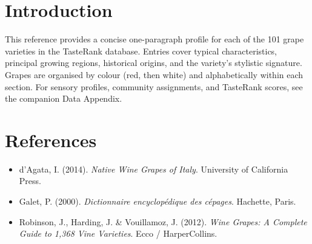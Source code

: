 \documentclass[11pt]{article}
\begin{document}

\section*{Introduction}
This reference provides a concise one-paragraph profile for each of the 101 grape varieties in the TasteRank database. Entries cover typical characteristics, principal growing regions, historical origins, and the variety's stylistic signature. Grapes are organised by colour (red, then white) and alphabetically within each section. For sensory profiles, community assignments, and TasteRank scores, see the companion Data Appendix.



\section*{References}

\begin{itemize}[leftmargin=2em,itemsep=0.2em]
\item d'Agata, I. (2014). \emph{Native Wine Grapes of Italy}. University of California Press.
\item Galet, P. (2000). \emph{Dictionnaire encyclop\'edique des c\'epages}. Hachette, Paris.
\item Robinson, J., Harding, J. \& Vouillamoz, J. (2012). \emph{Wine Grapes: A Complete Guide to 1{,}368 Vine Varieties}. Ecco / HarperCollins.
\end{itemize}
\end{document}
